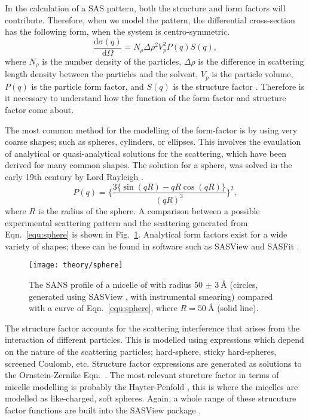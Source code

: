 In the calculation of a SAS pattern, both the structure and form factors will contribute.
Therefore, when we model the pattern, the differential cross-section has the following form, when the system is centro-symmetric.
%
\begin{equation}
	\frac{\text{d}\sigma(q)}{\text{d}\Omega} = N_\rho\Delta\rho^2V_p^2 P(q)S(q),
\end{equation}
%
where $N_\rho$ is the number density of the particles, $\Delta\rho$ is the difference in scattering length density between the particles and the solvent, $V_p$ is the particle volume, $P(q)$ is the particle form factor, and $S(q)$ is the structure factor \cite{Pedersen2002a}.
Therefore is it necessary to understand how the function of the form factor and structure factor come about.

The most common method for the modelling of the form-factor is by using very coarse shapes; such as spheres, cylinders, or ellipses.
This involves the evaulation of analytical or quasi-analytical solutions for the scattering, which have been derived for many common shapes.
The solution for a sphere, was solved in the early 19th century by Lord Rayleigh \cite{Pedersen2002a}.
%
\begin{equation}
	P(q) = \Bigg\{\frac{3\big\{\sin(qR) - qR\cos(qR)\big\}}{(qR)^3}\Bigg\}^2,
	\label{equ:sphere}
\end{equation}
%
where $R$ is the radius of the sphere. A comparison between a possible experimental scattering pattern and the scattering generated from Eqn.~\ref{equ:sphere} is shown in Fig.~\ref{fig:sphere}. Analytical form factors exist for a wide variety of shapes; these can be found in software such as SASView and SASFit \cite{sasview2018, sasfit2018}.
%
\begin{figure}
	\centering
	\texttt{[image: theory/sphere]}
	\caption{The SANS profile of a micelle of  with radius $\SI{50(3)}{\angstrom}$ (circles, generated using SASView \cite{sasview2018}, with instrumental smearing) compared with a curve of Eqn.~\ref{equ:sphere}, where $R = \SI{50}{\angstrom}$ (solid line).}
	\label{fig:sphere}
\end{figure}
%

The structure factor accounts for the scattering interference that arises from the interaction of different particles.
This is modelled using expressions which depend on the nature of the scattering particles; hard-sphere, sticky hard-spheres, screened Coulomb, etc.
Structure factor expressions are generated as solutions to the Ornstein-Zernike Eqn.~\cite{Klein2002}.
The most relevant sturcture factor in terms of micelle modelling is probably the Hayter-Penfold \cite{Hayter1981}, this is where the micelles are modelled as like-charged, soft spheres. 
Again, a whole range of these strucuture factor functions are built into the SASView package \cite{sasview2018}.


